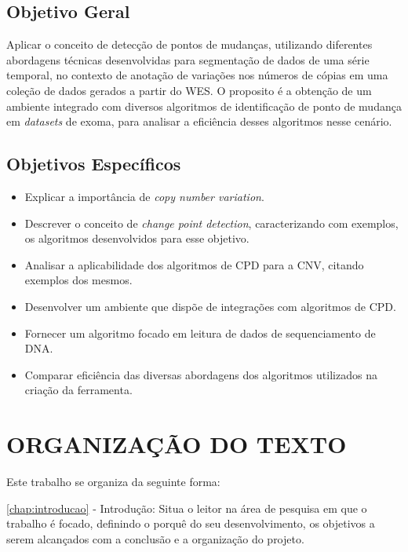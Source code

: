\subsection{Objetivo Geral}

Aplicar o conceito de detecção de pontos de mudanças, utilizando diferentes abordagens técnicas desenvolvidas para segmentação de dados de uma série temporal, no contexto de anotação de variações nos números de cópias em uma coleção de dados gerados a partir do WES. O proposito é a obtenção de um ambiente integrado com diversos algoritmos de identificação de ponto de mudança em \textit{datasets} de exoma, para analisar a eficiência desses algoritmos nesse cenário.

\subsection{Objetivos Específicos}
	
\begin{itemize}
    \item Explicar a importância de \textit{copy number variation}.
    \item Descrever o conceito de \textit{change point detection}, caracterizando com exemplos, os algoritmos desenvolvidos para esse objetivo.
    \item Analisar a aplicabilidade dos algoritmos de CPD para a CNV, citando exemplos dos mesmos.
    \item Desenvolver um ambiente que dispõe de integrações com algoritmos de CPD.
    \item Fornecer um algoritmo focado em leitura de dados de sequenciamento de DNA.
    \item Comparar eficiência das diversas abordagens dos algoritmos utilizados na criação da ferramenta.
\end{itemize}

\section{ORGANIZAÇÃO DO TEXTO}

Este trabalho se organiza da seguinte forma:

\autoref{chap:introducao} - Introdução: Situa o leitor na área de pesquisa em que o trabalho é focado, definindo o porquê do seu desenvolvimento, os objetivos a serem alcançados com a conclusão e a organização do projeto.

